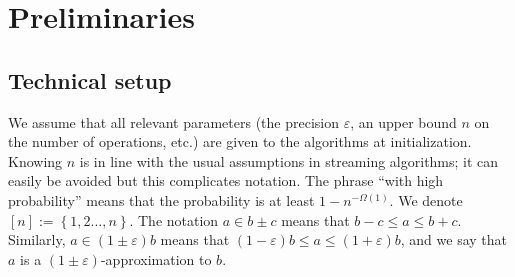 \documentclass[11pt]{article}
\def\set#1{\left\{ #1 \right\}}
\newcommand{\eps}{\varepsilon}
\begin{document}
\section{Preliminaries}
\label{sec:preliminaries}
%
\subsection{Technical setup}
We assume that all relevant parameters (the precision $\eps$, an upper bound $n$ on the number of operations, etc.) are given to the algorithms at initialization. Knowing $n$ is in line with the usual assumptions in streaming algorithms; it can easily be avoided but this complicates notation. The phrase ``with high probability'' means that the probability is at least $1 - n^{-\Omega(1)}$.
%
We denote $[n] := \set{1, 2 \dots, n}$. The notation $a \in b \pm c$ means that $b-c \leq a \leq b + c$. Similarly, $a \in (1 \pm \eps) b$ means that $(1-\eps)b \leq a \leq (1 + \eps)b$, and we say that $a$ is a $(1\pm\eps)$-approximation to $b$.
%
\end{document}
